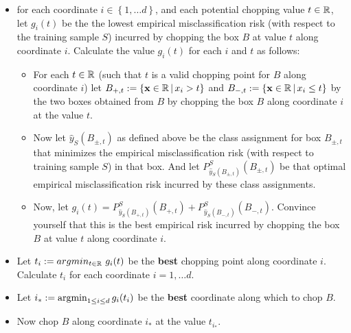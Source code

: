 \begin{itemize}
  \item for each coordinate $i\in\left\{ 1,\ldots d \right\}$, and each
    potential chopping value $t\in\mathbb{R}$, let $g_i(t)$ be the 
    the lowest empirical misclassification risk (with respect to the training
    sample $S$) incurred by
      chopping the box $B$ at value $t$ along coordinate $i$.
      Calculate the value $g_i(t)$ for each $i$ and $t$ as follows: 
    \begin{itemize}
      \item For each $t\in\mathbb{R}$ (such that $t$ is a valid chopping point for
	$B$ along coordinate $i$) let 
	$B_{+,t} := \left\{ \mathbf{x}\in\mathbb{R}\,|\, x_{i}>t \right\}$ 
	and 
	$B_{-,t} := \left\{ \mathbf{x}\in\mathbb{R}\,|\, x_{i}\leq t \right\}$ 
	by the two boxes obtained from $B$ by chopping the box $B$ along
	coordinate $i$ at the value $t$. 
      \item Now let $\hat{y}_S(B_{\pm,t})$ as defined above be the class assignment
	for box $B_{\pm,t}$ that minimizes the empirical misclassification risk (with respect to
	training sample $S$) in that box. And let 
      $P^S_{\hat{y}_S(B_{\pm,t})}(B_{\pm,t})$ be that optimal empirical
      misclassification risk incurred by these class assignments.
    \item Now, let $g_i(t) = P^S_{\hat{y}_S(B_{+,t})}(B_{+,t}) +
      P^S_{\hat{y}_S(B_{-,t})}(B_{-,t})$. Convince yourself that this is
      the best empirical risk incurred by
      chopping the box $B$ at value $t$ along coordinate $i$. 
    \end{itemize}
  \item Let $t_i := argmin_{t\in\mathbb{R}}\,\, g_i(t)$ be the {\bf best} chopping point along
    coordinate $i$. Calculate $t_i$ for each coordinate $i=1,\ldots d$.
  \item Let $i_* := \operatorname*{argmin}_{1\leq i \leq d} g_i(t_i)$ be the {\bf best} coordinate along which to chop $B$.
  \item Now chop $B$ along coordinate $i_*$ at the value $t_{i_*}$.
\end{itemize}

